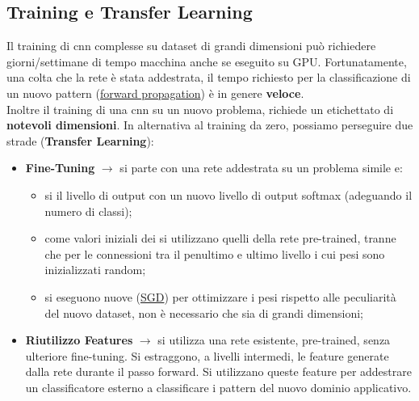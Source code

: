 \subsection{Training e Transfer Learning}\label{sub:cnn_training_e_transfer_learning} %
Il training di \ac{cnn} complesse su dataset di grandi dimensioni può richiedere giorni/settimane di tempo macchina anche se eseguito su GPU.
Fortunatamente, una colta che la rete è stata addestrata, il tempo richiesto per la classificazione di un nuovo pattern (\hyperref[sub:mlp_forward_propagation]{forward propagation}) è in genere \textbf{veloce}.
\\
Inoltre il training di una \ac{cnn} su un nuovo problema, richiede un  etichettato di \textbf{notevoli dimensioni}.
In alternativa al training da zero, possiamo perseguire due strade (\textbf{Transfer Learning}):
\begin{itemize}
    \item \textbf{Fine-Tuning} $\rightarrow$ si parte con una rete  addestrata su un problema simile e:
        \begin{itemize}
            \item si  il livello di output con un nuovo livello di output softmax (adeguando il numero di classi);
            \item come valori iniziali dei  si utilizzano quelli della rete pre-trained, tranne che per le connessioni tra il penultimo e ultimo livello i cui pesi sono inizializzati random;
            \item si eseguono nuove  (\hyperref[sub:stochastic_gradient_descent]{SGD}) per ottimizzare i pesi rispetto alle peculiarità del nuovo dataset, non è necessario che sia di grandi dimensioni;
        \end{itemize}
        
    \item \textbf{Riutilizzo Features} $\rightarrow$ si utilizza una rete esistente, pre-trained, senza ulteriore fine-tuning.
        Si estraggono, a livelli intermedi, le feature generate dalla rete durante il passo forward.
        Si utilizzano queste feature per addestrare un classificatore esterno a classificare i pattern del nuovo dominio applicativo.
\end{itemize}
